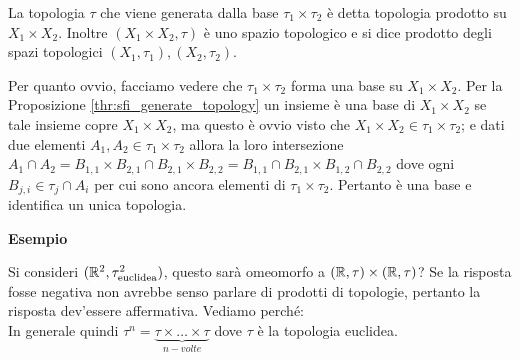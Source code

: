 \begin{definition}
	La topologia $\tau$ che viene generata dalla base $\tau_1 \times \tau_2$ è detta topologia prodotto su $X_1 \times X_2$. Inoltre $(X_1 \times X_2, \tau)$ è uno spazio topologico e si dice prodotto degli spazi topologici $(X_1, \tau_1), (X_2, \tau_2)$.
\end{definition}

\begin{remark}
	Per quanto ovvio, facciamo vedere che $\tau_1 \times \tau_2$ forma una base su $X_1 \times X_2$. Per la Proposizione \ref{thr:sfi_generate_topology} un insieme è una base di $X_1 \times X_2$ se tale insieme copre $X_1 \times X_2$, ma questo è ovvio visto che $X_1 \times X_2 \in \tau_1 \times \tau_2$; e dati due elementi $A_1, A_2 \in \tau_1 \times \tau_2$ allora la loro intersezione $A_1 \cap A_2 = B_{1,1} \times B_{2,1} \cap B_{2,1} \times B_{2,2} = B_{1,1}\cap B_{2,1} \times B_{1,2} \cap B_{2,2}$ dove ogni $B_{j,i} \in \tau_j \cap A_i$ per cui sono ancora elementi di $\tau_1 \times \tau_2$. Pertanto è una base e identifica un unica topologia.
\end{remark}

\textbf{Esempio}

Si consideri $(\mathbb{R}^2, \tau^2_{\text{euclidea}})$, questo sarà omeomorfo a $(\mathbb{R}, \tau) \times (\mathbb{R}, \tau)$? Se la risposta fosse negativa non avrebbe senso parlare di prodotti di topologie, pertanto la risposta dev'essere affermativa. Vediamo perché:\\


In generale quindi $\tau^n = \underset{n-volte}{\underbrace{\tau \times \dots \times \tau}}$ dove $\tau$ è la topologia euclidea. 

